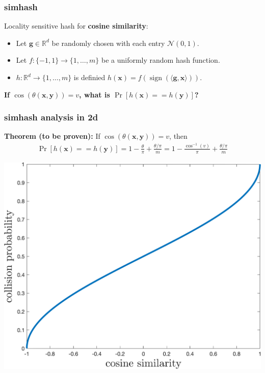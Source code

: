 \documentclass[compress]{beamer}
\newcommand{\bv}[1]{\mathbf{#1}}
\newcommand{\R}{\mathbb{R}}
\DeclareMathOperator{\sign}{sign}
\begin{document}
\begin{frame}
	\frametitle{simhash}
	Locality sensitive hash for \textbf{cosine similarity}:
	\begin{itemize}
		\item Let $\bv{g} \in \R^d$ be randomly chosen with each entry $\mathcal{N}(0,1)$. 
		\item Let $f: \{-1,1\} \rightarrow \{1,\ldots, m\}$ be a uniformly random hash function. 
		\item $h: \R^d \rightarrow \{1,\ldots, m\}$ is definied $h(\bv{x}) = f\left(\sign(\langle \bv{g}, \bv{x} \rangle)\right)$.
	\end{itemize}
	\begin{center}
		\alert{\textbf{
				\large
				If $\cos(\theta(\bv{x},\bv{y})) = v$, what is $\Pr[h(\bv{x}) == h(\bv{y})]$?
		}}
	\end{center}
\end{frame}


%		



\begin{frame}[t]
	\frametitle{simhash analysis in 2d}
	\textbf{Theorem (to be proven):} If $\cos(\theta(\bv{x},\bv{y})) = v$, then 
	\begin{align*}
		\Pr[h(\bv{x}) == h(\bv{y})] = 1 - \frac{\theta}{\pi}  + \frac{\theta/\pi}{m}= 1 - \frac{\cos^{-1}(v)}{\pi} + \frac{\theta/\pi}{m}
	\end{align*}
	\begin{center}
		\includegraphics[width=.6\textwidth]{cosine_sim.png}
	\end{center}
\end{frame}
\end{document}
